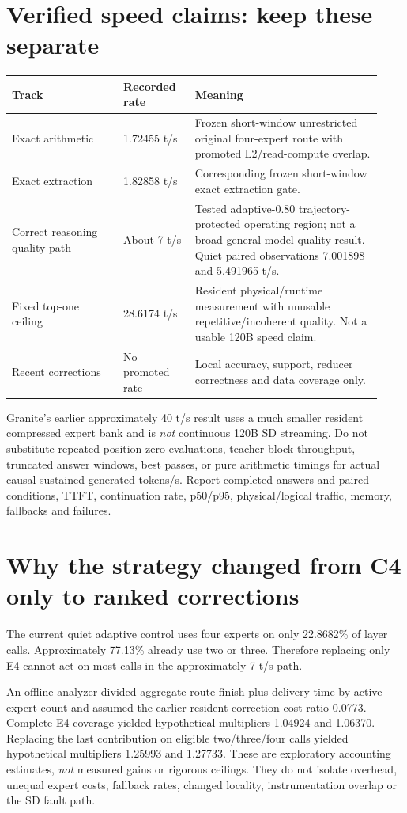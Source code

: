 \documentclass[11pt,a4paper]{article}
\begin{document}
\section{Verified speed claims: keep these separate}
\begin{longtable}{p{0.28\linewidth}p{0.18\linewidth}p{0.47\linewidth}}
\toprule Track & Recorded rate & Meaning \\ \midrule
Exact arithmetic & 1.72455 t/s & Frozen short-window unrestricted original four-expert route with promoted L2/read-compute overlap. \\
Exact extraction & 1.82858 t/s & Corresponding frozen short-window exact extraction gate. \\
Correct reasoning quality path & About 7 t/s & Tested adaptive-0.80 trajectory-protected operating region; not a broad general model-quality result. Quiet paired observations 7.001898 and 5.491965 t/s. \\
Fixed top-one ceiling & 28.6174 t/s & Resident physical/runtime measurement with unusable repetitive/incoherent quality. Not a usable 120B speed claim. \\
Recent corrections & No promoted rate & Local accuracy, support, reducer correctness and data coverage only. \\
\bottomrule
\end{longtable}
Granite's earlier approximately 40 t/s result uses a much smaller resident
compressed expert bank and is \emph{not} continuous 120B SD streaming.
Do not substitute repeated position-zero evaluations, teacher-block throughput,
truncated answer windows, best passes, or pure arithmetic timings for actual
causal sustained generated tokens/s. Report completed answers and paired
conditions, TTFT, continuation rate, p50/p95, physical/logical traffic, memory,
fallbacks and failures.

\section{Why the strategy changed from C4 only to ranked corrections}
The current quiet adaptive control uses four experts on only 22.8682\% of
layer calls. Approximately 77.13\% already use two or three. Therefore
replacing only E4 cannot act on most calls in the approximately 7 t/s path.

An offline analyzer divided aggregate route-finish plus delivery time by
active expert count and assumed the earlier resident correction cost ratio
0.0773. Complete E4 coverage yielded hypothetical multipliers 1.04924 and
1.06370. Replacing the last contribution on eligible two/three/four calls
yielded hypothetical multipliers 1.25993 and 1.27733. These are exploratory
accounting estimates, \emph{not} measured gains or rigorous ceilings. They do
not isolate overhead, unequal expert costs, fallback rates, changed locality,
instrumentation overlap or the SD fault path.
\end{document}
